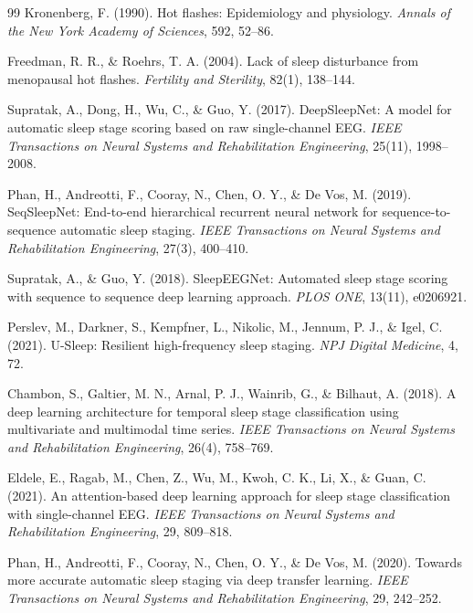 \documentclass[a4paper,fleqn]{cas-dc}
\begin{document}
\begin{thebibliography}{99}
 Kronenberg, F. (1990). Hot flashes: Epidemiology and physiology. \textit{Annals of the New York Academy of Sciences}, 592, 52--86.

 Freedman, R. R., \& Roehrs, T. A. (2004). Lack of sleep disturbance from menopausal hot flashes. \textit{Fertility and Sterility}, 82(1), 138--144.

 Supratak, A., Dong, H., Wu, C., \& Guo, Y. (2017). DeepSleepNet: A model for automatic sleep stage scoring based on raw single-channel EEG. \textit{IEEE Transactions on Neural Systems and Rehabilitation Engineering}, 25(11), 1998--2008.

 Phan, H., Andreotti, F., Cooray, N., Chen, O. Y., \& De Vos, M. (2019). SeqSleepNet: End-to-end hierarchical recurrent neural network for sequence-to-sequence automatic sleep staging. \textit{IEEE Transactions on Neural Systems and Rehabilitation Engineering}, 27(3), 400--410.

 Supratak, A., \& Guo, Y. (2018). SleepEEGNet: Automated sleep stage scoring with sequence to sequence deep learning approach. \textit{PLOS ONE}, 13(11), e0206921.

 Perslev, M., Darkner, S., Kempfner, L., Nikolic, M., Jennum, P. J., \& Igel, C. (2021). U-Sleep: Resilient high-frequency sleep staging. \textit{NPJ Digital Medicine}, 4, 72.

 Chambon, S., Galtier, M. N., Arnal, P. J., Wainrib, G., \& Bilhaut, A. (2018). A deep learning architecture for temporal sleep stage classification using multivariate and multimodal time series. \textit{IEEE Transactions on Neural Systems and Rehabilitation Engineering}, 26(4), 758--769.

 Eldele, E., Ragab, M., Chen, Z., Wu, M., Kwoh, C. K., Li, X., \& Guan, C. (2021). An attention-based deep learning approach for sleep stage classification with single-channel EEG. \textit{IEEE Transactions on Neural Systems and Rehabilitation Engineering}, 29, 809--818.

 Phan, H., Andreotti, F., Cooray, N., Chen, O. Y., \& De Vos, M. (2020). Towards more accurate automatic sleep staging via deep transfer learning. \textit{IEEE Transactions on Neural Systems and Rehabilitation Engineering}, 29, 242--252.

\end{thebibliography}
\end{document}
